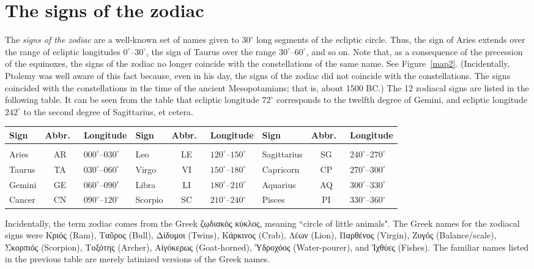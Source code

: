 \section{The signs of the zodiac}\label{szod}
The {\em signs of the zodiac}  are a well-known set of names given
to $30^\circ$ long segments of the ecliptic circle. Thus, the sign of Aries extends
over the range of ecliptic longitudes $0^\circ$--$30^\circ$, the sign of Taurus
over the range $30^\circ$--$60^\circ$, and so on. Note that, as
a consequence of the precession of the equinoxes, the signs
of the zodiac no longer coincide with the constellations of the same name. 
See Figure~\ref{map2}. (Incidentally, Ptolemy was well aware of this fact because, even in his day, the signs of the zodiac did not coincide with the constellations. The signs coincided with the constellations in the time of the ancient Mesopotamians; that is, about 1500 BC.)
The 12 zodiacal signs are listed in the following table.  It can be seen from the table that ecliptic longitude $72^\circ$ corresponds to the
twelfth degree of Gemini, and ecliptic longitude $242^\circ$  to the second degree of
Sagittarius, et cetera.
\begin{table}[h]
\centering
{\small
\begin{tabular}{lcl|lcl|lcl}
Sign & Abbr.\ & Longitude & Sign & Abbr.\ &Longitude & Sign & Abbr.\ &  Longitude\\[-0.0ex]\hline
&&&&&&&&\\[-1.8ex]
Aries & AR & $000^\circ$--$030^\circ$ & Leo & LE & $120^\circ$--$150^\circ$&Sagittarius & SG & $240^\circ$--$270^\circ$\\
Taurus & TA & $030^\circ$--$060^\circ$ & Virgo & VI & $150^\circ$--$180^\circ$ & Capricorn & CP & $270^\circ$--$300^\circ$\\
Gemini & GE & $060^\circ$--$090^\circ$ & Libra & LI & $180^\circ$--$210^\circ$ & Aquarius & AQ & $300^\circ$--$330^\circ$\\
Cancer & CN & $090^\circ$--$120^\circ$ & Scorpio & SC & $210^\circ$--$240^\circ$ & Pisces & PI & $330^\circ$--$360^\circ$\\
\end{tabular}}
\end{table}

Incidentally, the term zodiac comes from the Greek ζῳδιακός κύκλος, meaning ``circle of little animals".  The Greek names for the
zodiacal signs were  Κριός (Ram),  Ταῦρος (Bull), Δίδυμοι (Twins), Κάρκινος (Crab), 
Λέων (Lion), Παρθένος (Virgin), Ζυγός (Balance/scale), Σκορπιός (Scorpion),
Τοξότης (Archer), Αἰγόκερως (Goat-horned), Ὑδροχόος (Water-pourer), and  Ἰχθύες  (Fishes). The familiar names listed in the previous table are
merely latinized versions of the Greek names. 

